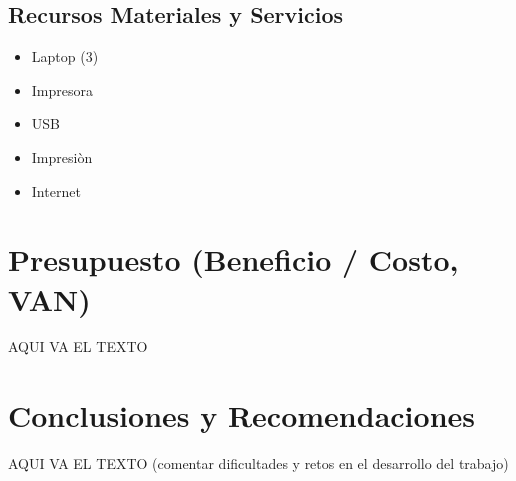 \documentclass[preprint,12pt]{elsarticle}
\begin{document}
\subsection{\textbf{Recursos Materiales y Servicios}}
\begin{itemize}
	\item Laptop (3)
	\item Impresora
	\item USB
	\item Impresiòn
	\item Internet
\end{itemize}
	
\section{Presupuesto (Beneficio / Costo, VAN)}
AQUI VA EL TEXTO

\section{Conclusiones y Recomendaciones }
AQUI VA EL TEXTO
(comentar dificultades y retos en el desarrollo del trabajo)



	
	\newpage
	


	
\end{document}
